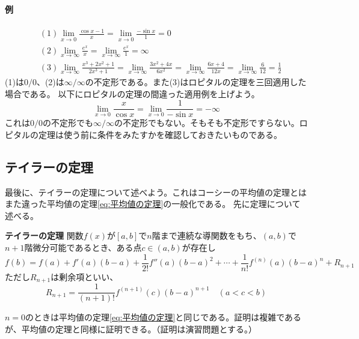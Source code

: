 \documentclass[a4j,dvipdfmx]{jsarticle}
\begin{document}
                    \paragraph{例}
                        \begin{align*}
                            &(1) \lim_{x\to 0}\frac{\cos x-1}{x}=\lim_{x\to 0}\frac{-\sin x}{1}=0\\
                            &(2) \lim_{x\to \infty}\frac{e^{x}}{x}=\lim_{x\to\infty}\frac{e^x}{1}=\infty\\\
                            &(3) \lim_{x\to \infty}\frac{x^3+2x^2+1}{2x^3+1}=\lim_{x\to \infty}\frac{3x^2+4x}{6x^2}=\lim_{x\to\infty}\frac{6x+4}{12x}=\lim_{x\to\infty}\frac{6}{12}=\frac{1}{2}
                        \end{align*}
                        (1)は$0/0$、(2)は$\infty/\infty$の不定形である。また(3)はロピタルの定理を三回適用した場合である。
                    以下にロピタルの定理の間違った適用例を上げよう。
                    \begin{equation*}
                        \lim_{x\to 0}\frac{x}{\cos x}=\lim_{x\to 0}\frac{1}{-\sin x}=-\infty
                    \end{equation*}    
                    これは$0/0$の不定形でも$\infty/\infty$の不定形でもない。そもそも不定形ですらない。ロピタルの定理は使う前に条件をみたすかを確認しておきたいものである。
                    
                \clearpage
                \subsection{テイラーの定理}
                    最後に、テイラーの定理について述べよう。これはコーシーの平均値の定理とはまた違った平均値の定理\eqref{eq:平均値の定理}の一般化である。
                    先に定理について述べる。
                    \begin{itembox}{\textbf{テイラーの定理}}
                        関数$f(x)$が$[a,b]$で$n$階まで連続な導関数をもち、$(a,b)$で$n+1$階微分可能であるとき、ある点$c\in(a,b)$が存在し
                        \begin{equation}
                            f(b)=f(a)+f'(a)(b-a)+\frac{1}{2!}f''(a)(b-a)^2+\cdots+\frac{1}{n!}f^{(n)}(a)(b-a)^n+R_{n+1}\label{eq:テイラーの定理}
                        \end{equation}
                        ただし$R_{n+1}$は剰余項といい、
                        \begin{equation}
                            R_{n+1}=\frac{1}{(n+1)!}f^{(n+1)}(c)(b-a)^{n+1}\quad(a<c<b)
                        \end{equation}
                    \end{itembox}
                    $n=0$のときは平均値の定理\eqref{eq:平均値の定理}と同じである。証明は複雑であるが、平均値の定理と同様に証明できる。（証明は演習問題とする。）
\end{document}
